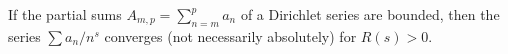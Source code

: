 If the partial sums $A_{m,p} = \sum_{n=m}^p a_n$ of a Dirichlet series are bounded, then the series $\sum a_n/n^s$ converges (not necessarily absolutely) for $R(s) > 0$.
